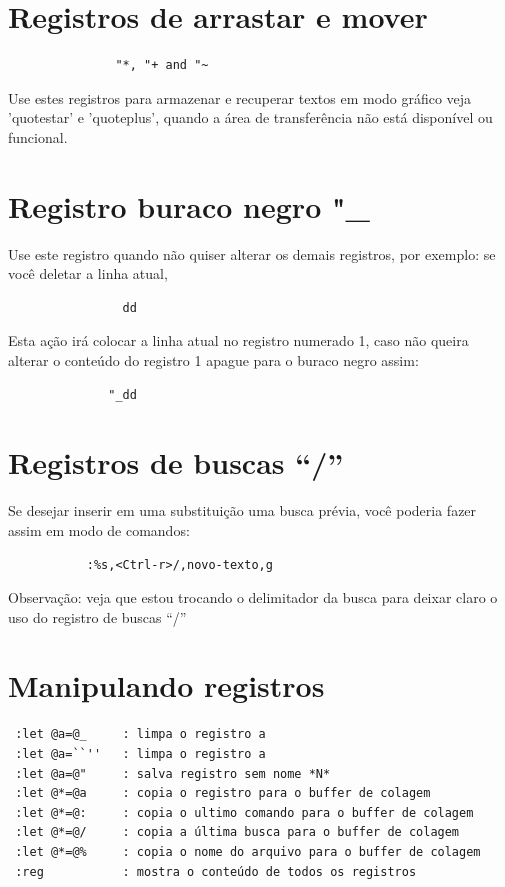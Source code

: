 \documentclass[10pt,a4paper,openany]{book}
\begin{document}
\section{Registros de arrastar e mover}
\label{Registros de arrastar e mover}

\begin{verbatim}
			   "*, "+ and "~
\end{verbatim}

Use estes registros para armazenar e recuperar textos em modo gráfico
veja 'quotestar' e 'quoteplus', quando a área de transferência não
está disponível ou funcional.

\section{Registro buraco negro "\_}
\label{Registro buraco negro}
Use este registro quando não quiser alterar os demais registros, por exemplo: se você deletar a linha atual,

\begin{verbatim}
				dd
\end{verbatim}

Esta ação irá colocar a linha atual no registro numerado 1, caso não
queira alterar o conteúdo do registro 1 apague para o buraco negro
assim:

\begin{verbatim}
			  "_dd
\end{verbatim}

\section{Registros de buscas ``/''}
\label{Registros de buscas ``/''}

Se desejar inserir em uma substituição uma busca prévia, você poderia
fazer assim em modo de comandos:

\begin{verbatim}
		   :%s,<Ctrl-r>/,novo-texto,g
\end{verbatim}

Observação: veja que estou trocando o delimitador da busca para deixar
claro o uso do registro de buscas ``/''

\section{Manipulando registros}
\label{Manipulando registros}

\begin{verbatim}
 :let @a=@_     : limpa o registro a
 :let @a=``''   : limpa o registro a
 :let @a=@"     : salva registro sem nome *N*
 :let @*=@a     : copia o registro para o buffer de colagem
 :let @*=@:     : copia o ultimo comando para o buffer de colagem
 :let @*=@/     : copia a última busca para o buffer de colagem
 :let @*=@%     : copia o nome do arquivo para o buffer de colagem
 :reg           : mostra o conteúdo de todos os registros
\end{verbatim}
\end{document}
